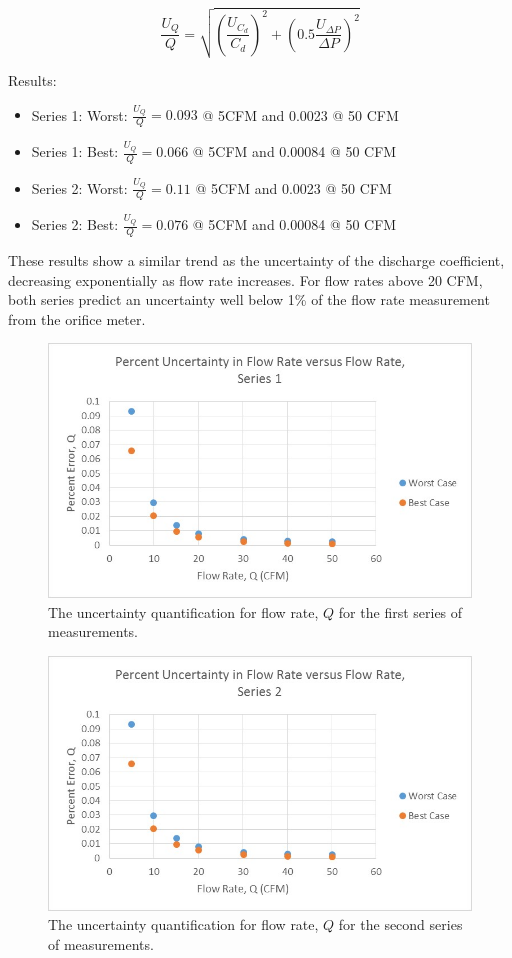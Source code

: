 \documentclass{article}
\begin{document}
\begin{equation}
  \frac{U_{Q}}{Q} = \sqrt{ \left(\frac{U_{C_d}}{C_d}\right)^2 + \left( 0.5 \frac{U_{\Delta P}}{\Delta P} \right)^2}
\end{equation}

Results:
\begin{itemize}
\item Series 1: Worst: $\frac{U_Q}{Q} = 0.093$ @ 5CFM and 0.0023 @ 50 CFM
\item Series 1: Best:  $\frac{U_Q}{Q} = 0.066$ @ 5CFM and 0.00084 @ 50 CFM
\item Series 2: Worst: $\frac{U_Q}{Q} = 0.11$ @ 5CFM and 0.0023 @ 50 CFM
\item Series 2: Best:  $\frac{U_Q}{Q} = 0.076$ @ 5CFM and 0.00084 @ 50 CFM
\end{itemize}

These results show a similar trend as the uncertainty of the discharge coefficient, decreasing 
exponentially as flow rate increases. For flow rates above 20 CFM, both series predict an uncertainty 
well below 1\% of the flow rate measurement from the orifice meter.

  \begin{figure}[!htb]
   \begin{center}
    \includegraphics[width = 12 cm]{figs/PercentUncertaintyQVsQ_Series1.jpg}
    \caption{The uncertainty quantification for flow rate, $Q$ for the first series of measurements.}
    \label{orif-s1}
   \end{center}
  \end{figure}

  \begin{figure}[!htb]
   \begin{center}
    \includegraphics[width = 12 cm]{figs/PercentUncertaintyQVsQ_Series2.jpg}
    \caption{The uncertainty quantification for flow rate, $Q$ for the second series of measurements.}
    \label{orif-s2}
   \end{center}
  \end{figure}

%
%
%
\end{document}
